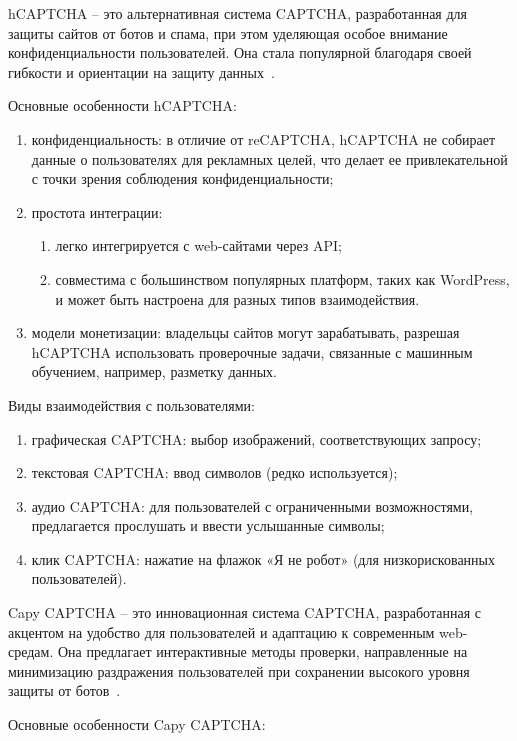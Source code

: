 hCAPTCHA -- это альтернативная система CAPTCHA, разработанная для защиты сайтов 
от ботов и спама, при этом уделяющая особое внимание конфиденциальности 
пользователей. Она стала популярной благодаря своей гибкости и ориентации на 
защиту данных~\cite{hcaptcha}.

Основные особенности hCAPTCHA:

\begin{enumerate}
    \item конфиденциальность: в отличие от reCAPTCHA, hCAPTCHA не собирает данные 
    о пользователях для рекламных целей, что делает ее привлекательной с точки 
    зрения соблюдения конфиденциальности;
    \item простота интеграции:
    \begin{enumerate}
        \item легко интегрируется с web-сайтами через API;
        \item совместима с большинством популярных платформ, таких как WordPress, 
        и может быть настроена для разных типов взаимодействия.
    \end{enumerate}
    \item модели монетизации: владельцы сайтов могут зарабатывать, разрешая 
    hCAPTCHA использовать проверочные задачи, связанные с машинным обучением, 
    например, разметку данных.
\end{enumerate}

Виды взаимодействия с пользователями:

\begin{enumerate}
    \item графическая CAPTCHA: выбор изображений, соответствующих запросу;
    \item текстовая CAPTCHA: ввод символов (редко используется);
    \item аудио CAPTCHA: для пользователей с ограниченными возможностями, 
    предлагается прослушать и ввести услышанные символы;
    \item клик CAPTCHA: нажатие на флажок «Я не робот» (для низкорискованных 
    пользователей).
\end{enumerate}

Capy CAPTCHA -- это инновационная система CAPTCHA, разработанная с акцентом на 
удобство для пользователей и адаптацию к современным web-средам. Она предлагает 
интерактивные методы проверки, направленные на минимизацию раздражения 
пользователей при сохранении высокого уровня защиты от ботов~\cite{capy}.

Основные особенности Capy CAPTCHA:

